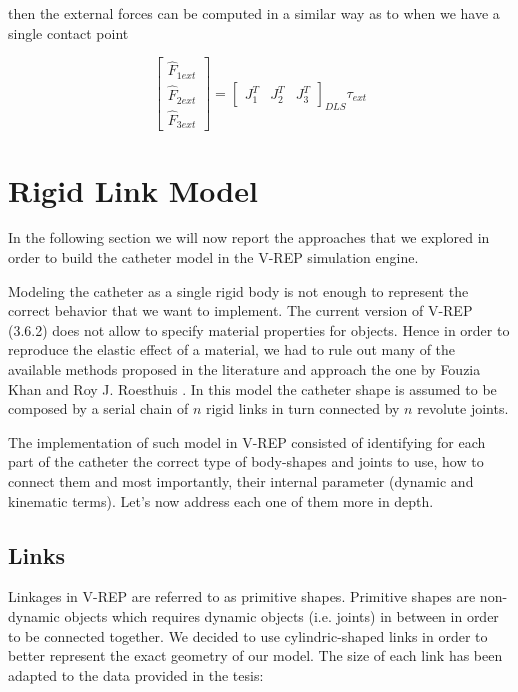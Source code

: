 \documentclass[conference,12pt]{IEEEtran}
\begin{document}
then the external forces can be computed in a similar way as to when we have a single contact point

\begin{equation}
\label{eq:3}
\begin{bmatrix}
\hat{F}_{1ext}\\
\hat{F}_{2ext}\\
\hat{F}_{3ext}
\end{bmatrix} = \begin{bmatrix}
J_1^T & J_2^T & J_3^T
\end{bmatrix}_{DLS}\tau_{ext}
\end{equation}

\section{Rigid Link Model}

In the following section we will now report the approaches that we explored in order to build the catheter model in the V-REP simulation engine.

Modeling the catheter as a single rigid body is not enough to represent the correct behavior that we  want to implement. The current version of V-REP (3.6.2) does not allow to specify material properties for objects. Hence in order to reproduce the elastic effect of a material, we had to rule out many of the available methods proposed in the literature and approach the one by Fouzia Khan and Roy J. Roesthuis \cite{khan}. In this model the catheter shape is assumed to be composed by a serial chain of $n$ rigid links in turn connected by $n$ revolute joints. 

The implementation of such model in V-REP consisted of identifying for each part of the catheter the correct type of body-shapes and joints to use, how to connect them and most importantly, their internal parameter (dynamic and kinematic terms). Let’s now address each one of them more in depth.

\subsection{Links}

Linkages in V-REP are referred to as primitive shapes. Primitive shapes are non-dynamic objects which requires dynamic objects (i.e. joints) in between in order to be connected together. We decided to use cylindric-shaped links in order to better represent the exact geometry of our model. The size of each link has been adapted to the data provided in the tesis:
\end{document}
